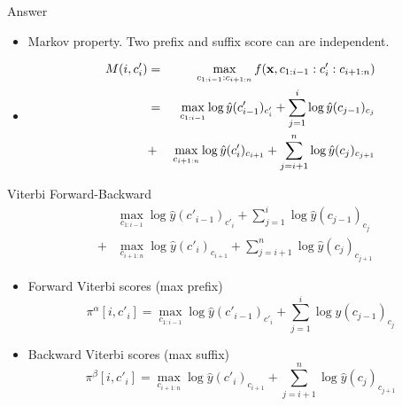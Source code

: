 \documentclass{beamer}
\begin{document}
\begin{frame}{Answer}
  \begin{itemize}
  \item Markov property. Two prefix and suffix score can are independent.
    \air 

  \item   
    \begin{eqnarray*}
      M(i, c'_i) &=& \max_{c_{1:i-1}:c_{i+1:n}} f(\mathbf{x}, c_{1:i-1}:c'_i:c_{i+1:n})  \\
       &=& \max_{c_{1:i-1}} \log \hat{y}(c'_{i-1})_{c'_{i}} + \sum_{j=1}^i \log  \hat{y}(c_{j-1})_{c_{j}}   \\
       &+& \max_{c_{i+1:n}} \log \hat{y}(c'_{i})_{c_{i+1}} +  \sum_{j=i+1}^n \log \hat{y}(c_{j})_{c_{j+1}}  
    \end{eqnarray*}

  \end{itemize}
\end{frame}

\begin{frame}{Viterbi Forward-Backward}
    \begin{eqnarray*}
       &&\max_{c_{1:i-1}} \log \hat{y}(c'_{i-1})_{c'_{i}} + \sum_{j=1}^i \log  \hat{y}(c_{j-1})_{c_{j}}   \\
       &+& \max_{c_{i+1:n}} \log \hat{y}(c'_{i})_{c_{i+1}} +  \sum_{j=i+1}^n \log \hat{y}(c_{j})_{c_{j+1}}  
    \end{eqnarray*}

   \begin{itemize}
  \item  Forward Viterbi scores (max prefix)
    \[  \pi^{\alpha}[i, c'_i]  = \max_{c_{1:i-1}} \log \hat{y}(c'_{i-1})_{c'_{i}} + \sum_{j=1}^i \log  \hat{y}(c_{j-1})_{c_{j}}   \]
    
    
    \air
  \item  Backward Viterbi scores (max suffix)
     \[ \pi^{\beta}[i, c'_i] = \max_{c_{i+1:n}} \log \hat{y}(c'_{i})_{c_{i+1}} +  \sum_{j=i+1}^n \log \hat{y}(c_{j})_{c_{j+1}} \]

   \end{itemize}
\end{frame}
\end{document}
